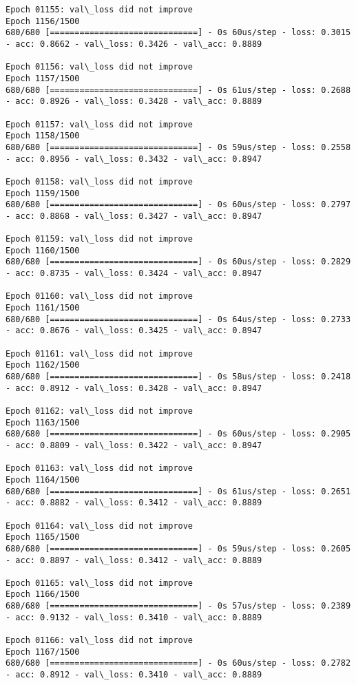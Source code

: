 \documentclass[11pt]{article}
\begin{document}
\begin{Verbatim}[commandchars=\\\{\}]
Epoch 01155: val\_loss did not improve
Epoch 1156/1500
680/680 [==============================] - 0s 60us/step - loss: 0.3015 - acc: 0.8662 - val\_loss: 0.3426 - val\_acc: 0.8889

Epoch 01156: val\_loss did not improve
Epoch 1157/1500
680/680 [==============================] - 0s 61us/step - loss: 0.2688 - acc: 0.8926 - val\_loss: 0.3428 - val\_acc: 0.8889

Epoch 01157: val\_loss did not improve
Epoch 1158/1500
680/680 [==============================] - 0s 59us/step - loss: 0.2558 - acc: 0.8956 - val\_loss: 0.3432 - val\_acc: 0.8947

Epoch 01158: val\_loss did not improve
Epoch 1159/1500
680/680 [==============================] - 0s 60us/step - loss: 0.2797 - acc: 0.8868 - val\_loss: 0.3427 - val\_acc: 0.8947

Epoch 01159: val\_loss did not improve
Epoch 1160/1500
680/680 [==============================] - 0s 60us/step - loss: 0.2829 - acc: 0.8735 - val\_loss: 0.3424 - val\_acc: 0.8947

Epoch 01160: val\_loss did not improve
Epoch 1161/1500
680/680 [==============================] - 0s 64us/step - loss: 0.2733 - acc: 0.8676 - val\_loss: 0.3425 - val\_acc: 0.8947

Epoch 01161: val\_loss did not improve
Epoch 1162/1500
680/680 [==============================] - 0s 58us/step - loss: 0.2418 - acc: 0.8912 - val\_loss: 0.3428 - val\_acc: 0.8947

Epoch 01162: val\_loss did not improve
Epoch 1163/1500
680/680 [==============================] - 0s 60us/step - loss: 0.2905 - acc: 0.8809 - val\_loss: 0.3422 - val\_acc: 0.8947

Epoch 01163: val\_loss did not improve
Epoch 1164/1500
680/680 [==============================] - 0s 61us/step - loss: 0.2651 - acc: 0.8882 - val\_loss: 0.3412 - val\_acc: 0.8889

Epoch 01164: val\_loss did not improve
Epoch 1165/1500
680/680 [==============================] - 0s 59us/step - loss: 0.2605 - acc: 0.8897 - val\_loss: 0.3412 - val\_acc: 0.8889

Epoch 01165: val\_loss did not improve
Epoch 1166/1500
680/680 [==============================] - 0s 57us/step - loss: 0.2389 - acc: 0.9132 - val\_loss: 0.3410 - val\_acc: 0.8889

Epoch 01166: val\_loss did not improve
Epoch 1167/1500
680/680 [==============================] - 0s 60us/step - loss: 0.2782 - acc: 0.8912 - val\_loss: 0.3410 - val\_acc: 0.8889


\end{Verbatim}
\end{document}
